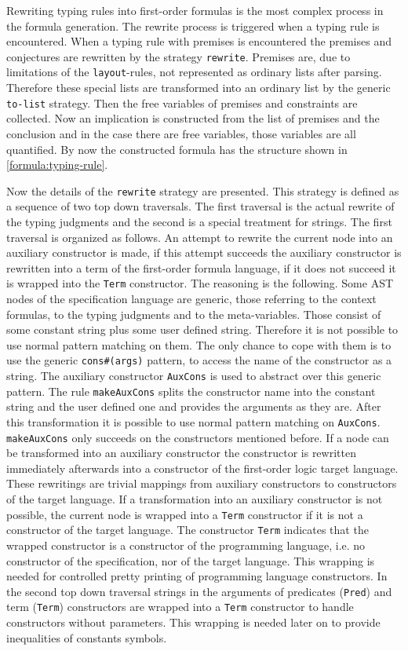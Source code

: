 Rewriting typing rules into first-order formulas is the most complex
process in the formula generation. The rewrite process is triggered
when a typing rule is encountered. When a typing rule with premises is
encountered the premises and conjectures are rewritten by the strategy
\texttt{rewrite}. Premises are, due to limitations of the
\texttt{layout}-rules, not represented as ordinary lists after
parsing. Therefore these special lists are transformed into an
ordinary list by the generic \texttt{to-list} strategy. Then the
free variables of premises and constraints are collected. Now an
implication is constructed from the list of premises and the
conclusion and in the case there are free variables, those variables
are all quantified. By now the constructed formula has the structure
shown in \ref{formula:typing-rule}.

Now the details of the \texttt{rewrite} strategy are presented. This
strategy is defined as a sequence of two top down traversals. The first
traversal is the actual rewrite of the typing judgments and the second
is a special treatment for strings. The first traversal is organized
as follows. An attempt to rewrite the current node into an auxiliary
constructor is made, if this attempt succeeds the auxiliary
constructor is rewritten into a term of the first-order formula
language, if it does not succeed it is wrapped into the \texttt{Term}
constructor. The reasoning is the following. Some AST nodes of the
specification language are generic, those referring to the context
formulas, to the typing judgments and to the meta-variables. Those
consist of some constant string plus some user defined
string. Therefore it is not possible to use normal pattern matching on
them. The only chance to cope with them is to use the generic
\texttt{cons\#(args)} pattern, to access the name of the constructor
as a string. The auxiliary constructor \texttt{AuxCons} is used to
abstract over this generic pattern. The rule \texttt{makeAuxCons}
splits the constructor name into the constant string and the user
defined one and provides the arguments as they are. After this
transformation it is possible to use normal pattern matching on
\texttt{AuxCons}. \texttt{makeAuxCons} only succeeds on the
constructors mentioned before. If a node can be transformed into an
auxiliary constructor the constructor is rewritten immediately
afterwards into a constructor of the first-order logic target
language. These rewritings are trivial mappings from auxiliary
constructors to constructors of the target language. If a
transformation into an auxiliary constructor is not possible, the
current node is wrapped into a \texttt{Term} constructor if it is not
a constructor of the target language. The constructor \texttt{Term}
indicates that the wrapped constructor is a constructor of the
programming language, i.e. no constructor of the specification, nor of
the target language. This wrapping is needed for controlled pretty
printing of programming language constructors. In the second top down
traversal strings in the arguments of predicates (\texttt{Pred}) and
term (\texttt{Term}) constructors are wrapped into a \texttt{Term}
constructor to handle constructors without parameters. This wrapping
is needed later on to provide inequalities of constants symbols.

